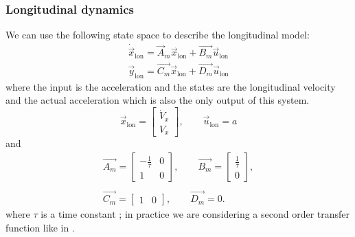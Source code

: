 \subsubsection{Longitudinal dynamics}
We can use the following state space to describe the longitudinal model:
\begin{equation}
\label{eqn:longi_dynamics_simple_model_ss}
\begin{array}{ll}
\dot{\vec{x}}_{\text{lon}} =\vec{A}_m \vec{x}_{\text{lon}}+ \vec{B_m}\vec{u}_{\text{lon}}\\
\vec{y}_{\text{lon}} =\vec{C_m} \vec{x}_{\text{lon}} + \vec{D_m} \vec{u}_{\text{lon}}
\end{array}
\end{equation}
where the input is the acceleration and the states are the longitudinal velocity and the actual acceleration which is also the only output of this system.
\begin{equation}
\vec{x}_{\text{lon}} = \begin{bmatrix}
\dot{V}_x\\V_x
\end{bmatrix},
\qquad
\vec{u}_{\text{lon}} = a
\end{equation}
and
\begin{equation}
\begin{array}{cc}
\vec{A_m}=\begin{bmatrix}
-\frac{1}{\tau}&0\\1&0
\end{bmatrix},
\qquad
\vec{B_m}=\begin{bmatrix}
\frac{1}{\tau}\\
0
\end{bmatrix},\\\\
\vec{C_m}=\begin{bmatrix}
1&0
\end{bmatrix}, 
\qquad
\vec{D_m}=0.
\end{array}
\end{equation}
where $\tau$ is a time constant \cite{long_tf}; in practice we are considering a second order transfer function like in \cite{longitudinal}.
